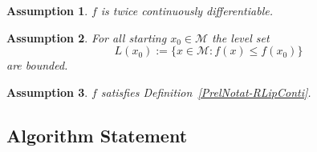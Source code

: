 \documentclass[11pt]{article}
\newcommand{\whcomm}[2]{{\sf\color{purple} #1}{\sf\color{blue} #2}}
\newtheorem{assumption}{Assumption}[section]
\numberwithin{equation}{section}
\begin{document}
\begin{assumption} \label{TwiceContinuDiff}
  $f$ is twice continuously differentiable.
\end{assumption} 

\begin{assumption} \label{BoundedLevel}
  For all starting $x_0\in \mathcal{M}$ the level set 
  \[
    L(x_0) := \{x\in\mathcal{M} : f(x) \le f(x_0)\} 
    \]
    are bounded.
\end{assumption}

\begin{assumption} \label{RadLipCont}
	$f$ satisfies Definition~\ref{PrelNotat-RLipConti}. 
\end{assumption}



\subsection{Algorithm Statement} %



\end{document}
